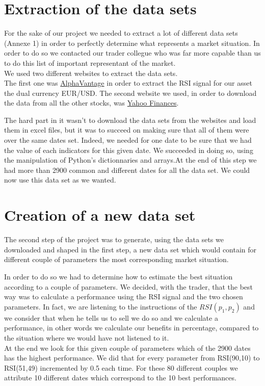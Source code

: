 \documentclass[]{article}
\begin{document}
\section{Extraction of the data sets}

\vskip 0.5cm
For the sake of our project we needed to extract a lot of different data sets (Annexe 1) in order to perfectly determine what represents a market situation. In order to do so we contacted our trader collegue who was far more capable than us to do this list of important representant of the market.\\
We used two different websites to extract the data sets.\\
The first one was \href{https://www.alphavantage.co/}{AlphaVantage} in order to extract the RSI signal for our asset the dual currency EUR/USD.
The second website we used, in order to download the data from all the other stocks, was \href{https://fr.finance.yahoo.com/}{Yahoo Finances}. 

\vskip 0.5cm
The hard part in it wasn't to download the data sets from the websites and load them in excel files, but it was to succeed on making sure that all of them were over the same dates set. Indeed, we needed for one date to be sure that we had the value of each indicators for this given date. We succeeded in doing so, using the manipulation of Python's dictionnaries and arrays.At the end of this step we had more than 2900 common and different dates for all the data set. We could now use this data set as we wanted.

\section{Creation of a new data set}

\vskip 0.5cm
The second step of the project was to generate, using the data sets we downloaded and shaped in the first step, a new data set which would contain for different couple of parameters the most corresponding market situation.

\vskip 0.5cm
In order to do so we had to determine how to estimate the best situation according to a couple of parameters. We decided, with the trader, that the best way was to calculate a performance using the RSI signal and the two chosen parameters. In fact, we are listening to the instructions of the \(RSI(p_1,p_2)\) and we consider that when he tells us to sell we do so and we calculate a performance, in other words we calculate our benefits in percentage, compared to the situation where we would have not listened to it.\\
At the end we look for this given couple of parameters which of the 2900 dates has the highest performance. We did that for every parameter from RSI(90,10) to RSI(51,49) incremented by 0.5 each time. For these 80 different couples we attribute 10 different dates which correspond to the 10 best performances. 
\end{document}

